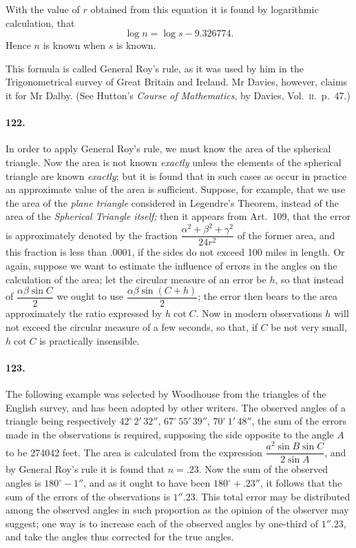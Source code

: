 \documentclass{book}[2004/02/16]
\begin{document}
\begin{mainmatter}
\begin{spacing}{1.3}
With the value of $r$ obtained from this equation it is found by
logarithmic calculation, that
\[
\log n = \log s - 9.326774.
\]
Hence $n$ is known when $s$ is known.

This formula is called General Roy's rule, as it was used by
him in the Trigonometrical survey of Great Britain and Ireland.
Mr Davies, however, claims it for Mr Dalby. (See Hutton's
\textit{Course of Mathematics}, by Davies, Vol.~\textsc{ii}.\ p.~47.)

\paragraph{122.} In order to apply General Roy's rule, we must know
the area of the spherical triangle. Now the area is not known
\textit{exactly} unless the elements of the spherical triangle are known
\textit{exactly}; but it is found that in such cases as occur in practice an
approximate value of the area is sufficient. Suppose, for example,
that we use the area of the \textit{plane triangle} considered in Legendre's
Theorem, instead of the area of the \textit{Spherical Triangle itself;}
then it appears from Art.\ 109, that the error is approximately
denoted by the fraction $\dfrac{\alpha^2+\beta^2+\gamma^2}{24r^2}$ of the former area, and this
fraction is less than $.0001$, if the sides do not exceed 100 miles
in length. Or again, suppose we want to estimate the influence
of errors in the angles on the calculation of the area; let the
circular measure of an error be $h$, so that instead of $\dfrac{\alpha\beta\sin C}{2}$
we ought to use $\dfrac{\alpha\beta\sin(C+h)}{2}$; the error then bears to the area
approximately the ratio expressed by $h\cot C$. Now in modern
observations $h$ will not exceed the circular measure of a few
seconds, so that, if $C$ be not very small, $h\cot C$ is practically insensible.

\paragraph{123.} The following example was selected by Woodhouse from
the triangles of the English survey, and has been adopted by other
writers. The observed angles of a triangle being respectively
$42^\circ\, 2'\, 32''$, $67^\circ\, 55'\, 39''$, $70^\circ\, 1'\, 48''$, the sum of the errors made
in the observations is required, supposing the side opposite to the
angle $A$ to be 274042 feet. The area is calculated from the expression
$\dfrac{a^2\sin B\sin C}{2\sin A}$, and by General Roy's rule it is found
that $n=.23$. Now the sum of the observed angles is $180^\circ-1''$,
and as it ought to have been $180^\circ +.23''$, it follows that the sum
of the errors of the observations is $1''.23$. This total error may
be distributed among the observed angles in such proportion as
the opinion of the observer may suggest; one way is to increase
each of the observed angles by one-third of $1''.23$, and take the
angles thus corrected for the true angles.


\end{spacing}
\end{mainmatter}
\end{document}
